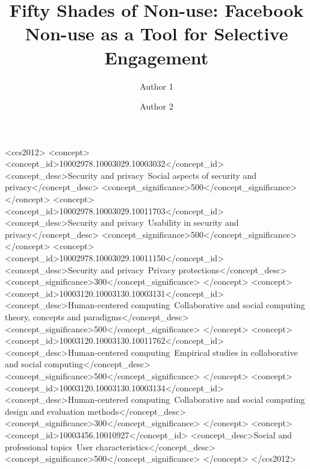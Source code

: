 \documentclass[format=acmsmall, review=false, screen=true, anonymous=true]{acmart}
\begin{document}
\title[]{Fifty Shades of Non-use: Facebook Non-use as a Tool for Selective Engagement}

\author{Author 1}
\author{Author 2}




\begin{CCSXML}
<ccs2012>
<concept>
<concept_id>10002978.10003029.10003032</concept_id>
<concept_desc>Security and privacy~Social aspects of security and privacy</concept_desc>
<concept_significance>500</concept_significance>
</concept>
<concept>
<concept_id>10002978.10003029.10011703</concept_id>
<concept_desc>Security and privacy~Usability in security and privacy</concept_desc>
<concept_significance>500</concept_significance>
</concept>
<concept>
<concept_id>10002978.10003029.10011150</concept_id>
<concept_desc>Security and privacy~Privacy protections</concept_desc>
<concept_significance>300</concept_significance>
</concept>
<concept>
<concept_id>10003120.10003130.10003131</concept_id>
<concept_desc>Human-centered computing~Collaborative and social computing theory, concepts and paradigms</concept_desc>
<concept_significance>500</concept_significance>
</concept>
<concept>
<concept_id>10003120.10003130.10011762</concept_id>
<concept_desc>Human-centered computing~Empirical studies in collaborative and social computing</concept_desc>
<concept_significance>500</concept_significance>
</concept>
<concept>
<concept_id>10003120.10003130.10003134</concept_id>
<concept_desc>Human-centered computing~Collaborative and social computing design and evaluation methods</concept_desc>
<concept_significance>300</concept_significance>
</concept>
<concept>
<concept_id>10003456.10010927</concept_id>
<concept_desc>Social and professional topics~User characteristics</concept_desc>
<concept_significance>500</concept_significance>
</concept>
</ccs2012>
\end{CCSXML}

\end{document}
